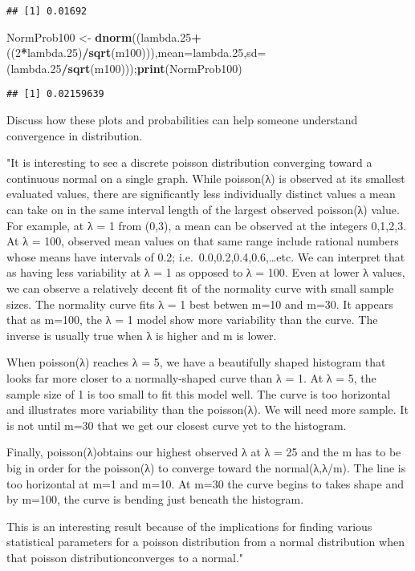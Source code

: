 \documentclass[
]{article}
\newenvironment{Shaded}{\begin{snugshade}}{\end{snugshade}}
\newcommand{\DataTypeTok}[1]{\textcolor[rgb]{0.13,0.29,0.53}{#1}}
\newcommand{\DecValTok}[1]{\textcolor[rgb]{0.00,0.00,0.81}{#1}}
\newcommand{\FloatTok}[1]{\textcolor[rgb]{0.00,0.00,0.81}{#1}}
\newcommand{\KeywordTok}[1]{\textcolor[rgb]{0.13,0.29,0.53}{\textbf{#1}}}
\newcommand{\NormalTok}[1]{#1}
\newcommand{\OperatorTok}[1]{\textcolor[rgb]{0.81,0.36,0.00}{\textbf{#1}}}
\newcommand{\StringTok}[1]{\textcolor[rgb]{0.31,0.60,0.02}{#1}}
\begin{document}
\begin{verbatim}
## [1] 0.01692
\end{verbatim}

\begin{Shaded}
\begin{Highlighting}[]
\NormalTok{NormProb100 <-}\StringTok{ }\KeywordTok{dnorm}\NormalTok{((lambda}\FloatTok{.25}\OperatorTok{+}\NormalTok{((}\DecValTok{2}\OperatorTok{*}\NormalTok{lambda}\FloatTok{.25}\NormalTok{)}\OperatorTok{/}\KeywordTok{sqrt}\NormalTok{(m100))),}\DataTypeTok{mean=}\NormalTok{lambda}\FloatTok{.25}\NormalTok{,}\DataTypeTok{sd=}\NormalTok{(lambda}\FloatTok{.25}\OperatorTok{/}\KeywordTok{sqrt}\NormalTok{(m100)));}\KeywordTok{print}\NormalTok{(NormProb100)}
\end{Highlighting}
\end{Shaded}

\begin{verbatim}
## [1] 0.02159639
\end{verbatim}

Discuss how these plots and probabilities can help someone understand
convergence in distribution.

"It is interesting to see a discrete poisson distribution converging
toward a continuous normal on a single graph. While poisson(λ) is
observed at its smallest evaluated values, there are significantly less
individually distinct values a mean can take on in the same interval
length of the largest observed poisson(λ) value. For example, at λ = 1
from (0,3), a mean can be observed at the integers 0,1,2,3. At λ = 100,
observed mean values on that same range include rational numbers whose
means have intervals of 0.2; i.e.~0.0,0.2,0.4,0.6,\ldots etc. We can
interpret that as having less variability at λ = 1 as opposed to λ =
100. Even at lower λ values, we can observe a relatively decent fit of
the normality curve with small sample sizes. The normality curve fits λ
= 1 best betwen m=10 and m=30. It appears that as m=100, the λ = 1 model
show more variability than the curve. The inverse is usually true when λ
is higher and m is lower.

When poisson(λ) reaches λ = 5, we have a beautifully shaped histogram
that looks far more closer to a normally-shaped curve than λ = 1. At λ =
5, the sample size of 1 is too small to fit this model well. The curve
is too horizontal and illustrates more variability than the poisson(λ).
We will need more sample. It is not until m=30 that we get our closest
curve yet to the histogram.

Finally, poisson(λ)obtains our highest observed λ at λ = 25 and the m
has to be big in order for the poisson(λ) to converge toward the
normal(λ,λ/m). The line is too horizontal at m=1 and m=10. At m=30 the
curve begins to takes shape and by m=100, the curve is bending just
beneath the histogram.

This is an interesting result because of the implications for finding
various statistical parameters for a poisson distribution from a normal
distribution when that poisson distributionconverges to a normal."
\end{document}
